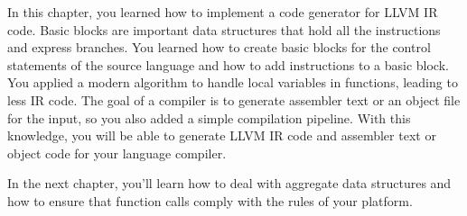 In this chapter, you learned how to implement a code generator for LLVM IR code. Basic blocks are important data structures that hold all the instructions and express branches. You learned how to create basic blocks for the control statements of the source language and how to add instructions to a basic block. You applied a modern algorithm to handle local variables in functions, leading to less IR code. The goal of a compiler is to generate assembler text or an object file for the input, so you also added a simple compilation pipeline. With this knowledge, you will be able to generate LLVM IR code and assembler text or object code for your language compiler.

In the next chapter, you’ll learn how to deal with aggregate data structures and how to ensure that function calls comply with the rules of your platform.